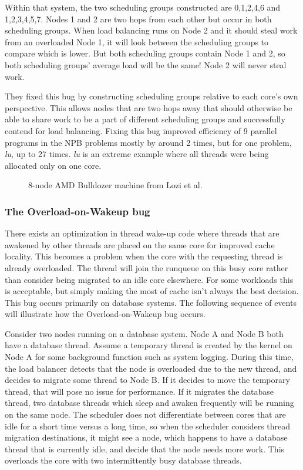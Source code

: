\documentclass{sig-alternate}
\begin{document}
Within that system, the two scheduling groups constructed are {0,1,2,4,6} and {1,2,3,4,5,7}. Nodes 1 and 2 are two hops from each other but occur in both scheduling groups. When load balancing runs on Node 2 and it should steal work from an overloaded Node 1, it will look between the scheduling groups to compare which is lower. But both scheduling groups contain Node 1 and 2, so both scheduling groups' average load will be the same! Node 2 will never steal work.~\cite{Lozi:2016}

They fixed this bug by constructing scheduling groups relative to each core's own perspective. This allows nodes that are two hops away that should otherwise be able to share work to be a part of different scheduling groups and successfully contend for load balancing. Fixing this bug improved efficiency of 9 parallel programs in the NPB problems mostly by around 2 times, but for one problem, \textit{lu}, up to 27 times. \textit{lu} is an extreme example where all threads were being allocated only on one core.~\cite{Lozi:2016}

\begin{figure}
\centering
{}
\caption{8-node AMD Bulldozer machine from Lozi et al.~\cite{Lozi:2016}}
\label{fig:cfs_schedgroups}
\end{figure}

\subsubsection{The Overload-on-Wakeup bug}
\label{sec:cfsfault_overload}


There exists an optimization in thread wake-up code where threads that are awakened by other threads are placed on the same core for improved cache locality. This becomes a problem when the core with the requesting thread is already overloaded. The thread will join the runqueue on this busy core rather than consider being migrated to an idle core elsewhere. For some workloads this is acceptable, but simply making the most of cache isn't always the best decision. This bug occurs primarily on database systems. The following sequence of events will illustrate how the Overload-on-Wakeup bug occurs.~\cite{Lozi:2016}

Consider two nodes running on a database system. Node A and Node B both have a database thread. Assume a temporary thread is created by the kernel on Node A for some background function such as system logging. During this time, the load balancer detects that the node is overloaded due to the new thread, and decides to migrate some thread to Node B. If it decides to move the temporary thread, that will pose no issue for performance. If it migrates the database thread, two database threads which sleep and awaken frequently will be running on the same node. The scheduler does not differentiate between cores that are idle for a short time versus a long time, so when the scheduler considers thread migration destinations, it might see a node, which happens to have a database thread that is currently idle, and decide that the node needs more work. This overloads the core with two intermittently busy database threads.~\cite{Lozi:2016}
\end{document}
